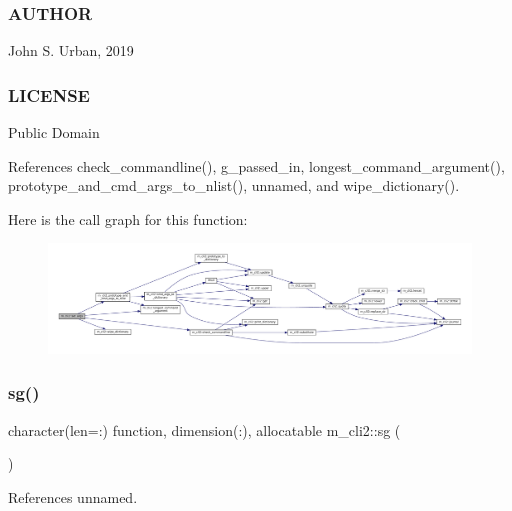 \subsubsection*{A\+U\+T\+H\+OR}

John S. Urban, 2019 \subsubsection*{L\+I\+C\+E\+N\+SE}

Public Domain 

References check\+\_\+commandline(), g\+\_\+passed\+\_\+in, longest\+\_\+command\+\_\+argument(), prototype\+\_\+and\+\_\+cmd\+\_\+args\+\_\+to\+\_\+nlist(), unnamed, and wipe\+\_\+dictionary().

Here is the call graph for this function\+:\nopagebreak
\begin{figure}[H]
\begin{center}
\leavevmode
\includegraphics[width=350pt]{namespacem__cli2_a6d20994aa80217dd3d0ffd1d5586f736_cgraph}
\end{center}
\end{figure}
\mbox{\label{namespacem__cli2_abc94b8f97a6056ea48ce48ab460bdf78}} 
\subsubsection{\texorpdfstring{sg()}{sg()}}
{\footnotesize\ttfamily character(len=\+:) function, dimension(\+:), allocatable m\+\_\+cli2\+::sg (\begin{DoxyParamCaption}{ }\end{DoxyParamCaption})\hspace{0.3cm}{\ttfamily [private]}}



References unnamed.

\mbox{\label{namespacem__cli2_afb7e36674c50a0839bd4eae8301efefc}} 
